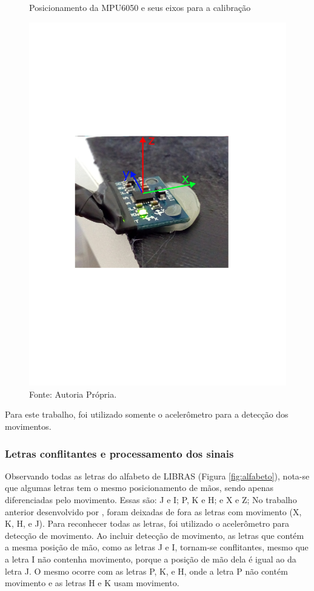 \begin{figure}[H]
	\vspace{4mm}
	\centering
	\caption{Posicionamento da MPU6050 e seus eixos para a calibração}
	\label{fig:MPU_Calb}
	\includegraphics[scale=0.7, trim={5cm 10cm 7cm 9.3cm}, clip]{imagens/mpu_calib.pdf}
	\caption*{Fonte: Autoria Própria.}
\end{figure}

Para este trabalho, foi utilizado somente o acelerômetro para a detecção dos movimentos.

\subsubsection{Letras conflitantes e processamento dos sinais}
Observando todas as letras do alfabeto de LIBRAS (Figura \ref{fig:alfabeto}), nota-se que algumas letras tem o mesmo posicionamento de mãos, sendo apenas diferenciadas pelo movimento. Essas são: J e I; P, K e H; e X e Z; No trabalho anterior desenvolvido por , foram deixadas de fora as letras com movimento (X, K, H, e J). Para reconhecer todas as letras, foi utilizado o acelerômetro para detecção de movimento.
Ao incluir detecção de movimento, as letras que contém a mesma posição de mão, como as letras J e I, tornam-se conflitantes, mesmo que a letra I não contenha movimento, porque a posição de mão dela é igual ao da letra J. O mesmo ocorre com as letras P, K, e H, onde a letra P não contém movimento e as letras H e K usam movimento.

